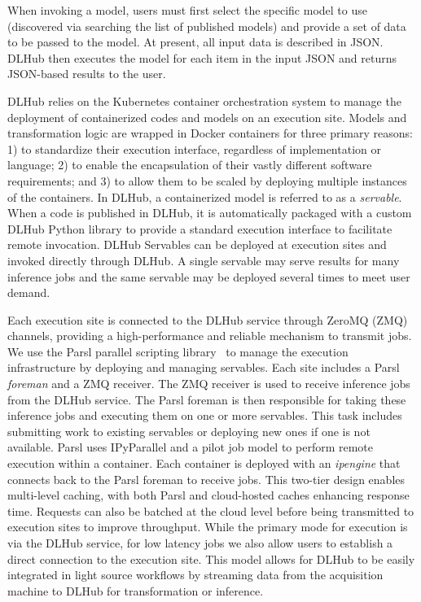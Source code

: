 \documentclass{aip-cp}
\begin{document}
When invoking a model, users must first select the specific model to use
(discovered via searching the list of published models) and provide a set of
data to be passed to the model. At present, all input data is described in
JSON.  DLHub then executes the model for each item in the input JSON and
returns JSON-based results to the user.

DLHub relies on the Kubernetes container orchestration system to manage the
deployment of containerized codes and models on an execution site.  Models and
transformation logic are wrapped in Docker containers for three primary
reasons:  1) to standardize their execution interface, regardless of
implementation or language; 2) to enable the encapsulation of their vastly
different software requirements; and 3) to allow them to be scaled by deploying multiple instances of the containers. In DLHub, a containerized model is referred to as a \textit{servable}.  When a code is
published in DLHub, it is automatically packaged with a custom DLHub Python
library to provide a standard execution interface to facilitate remote
invocation. DLHub Servables can be deployed at execution sites and invoked
directly through DLHub.  A single servable may serve results for many
inference jobs and the same servable may be deployed several times to meet
user demand.

Each execution site is connected to the DLHub service through ZeroMQ (ZMQ)
channels, providing a high-performance and reliable mechanism to transmit
jobs. We use the Parsl parallel scripting library~\cite{parsl} to manage the
execution infrastructure by deploying and managing servables. Each site
includes a Parsl \textit{foreman} and a ZMQ receiver.  The ZMQ receiver is
used to receive inference jobs from the DLHub service.  The Parsl foreman is
then responsible for taking these inference jobs and executing them on one or
more servables. This task includes submitting work to existing servables or
deploying new ones if  one is not available. Parsl uses IPyParallel and a
pilot job  model to perform remote execution within a container.  Each
container is deployed with an \textit{ipengine} that  connects back to the
Parsl foreman to receive jobs.  This two-tier design enables multi-level
caching, with both Parsl and cloud-hosted caches enhancing response time.
Requests can also be  batched at the cloud level before being transmitted to
execution sites to improve throughput. While the primary mode for execution is
via the DLHub service,  for low latency jobs we also allow users to establish
a direct connection to the execution site. This model allows for DLHub to be
easily integrated in light source workflows by streaming data from the
acquisition machine to DLHub for transformation or inference.
\end{document}
